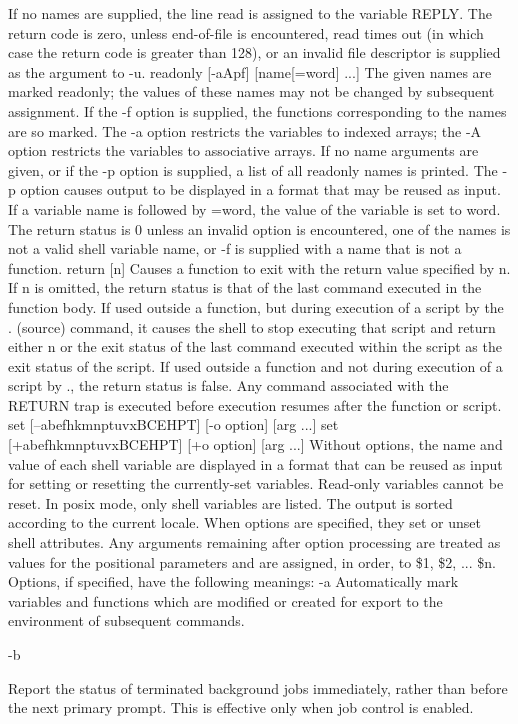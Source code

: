 If no names are supplied, the line read is assigned to the variable REPLY. The return code is zero, unless end-of-file is encountered, read times out (in which case the return code is greater than 128), or an invalid file descriptor is supplied as the argument to -u.
readonly [-aApf] [name[=word] ...]
The given names are marked readonly; the values of these names may not be changed by subsequent assignment. If the -f option is supplied, the functions corresponding to the names are so marked. The -a option restricts the variables to indexed arrays; the -A option restricts the variables to associative arrays. If no name arguments are given, or if the -p option is supplied, a list of all readonly names is printed. The -p option causes output to be displayed in a format that may be reused as input. If a variable name is followed by =word, the value of the variable is set to word. The return status is 0 unless an invalid option is encountered, one of the names is not a valid shell variable name, or -f is supplied with a name that is not a function.
return [n]
Causes a function to exit with the return value specified by n. If n is omitted, the return status is that of the last command executed in the function body. If used outside a function, but during execution of a script by the . (source) command, it causes the shell to stop executing that script and return either n or the exit status of the last command executed within the script as the exit status of the script. If used outside a function and not during execution of a script by ., the return status is false. Any command associated with the RETURN trap is executed before execution resumes after the function or script.
set [--abefhkmnptuvxBCEHPT] [-o option] [arg ...] \label{sbc:set}
set [+abefhkmnptuvxBCEHPT] [+o option] [arg ...]
Without options, the name and value of each shell variable are displayed in a format that can be reused as input for setting or resetting the currently-set variables. Read-only variables cannot be reset. In posix mode, only shell variables are listed. The output is sorted according to the current locale. When options are specified, they set or unset shell attributes. Any arguments remaining after option processing are treated as values for the positional parameters and are assigned, in order, to \$1, \$2, ... \$n. Options, if specified, have the following meanings:
-a
Automatically mark variables and functions which are modified or created for export to the environment of subsequent commands.

-b

Report the status of terminated background jobs immediately, rather than before the next primary prompt. This is effective only when job control is enabled.


